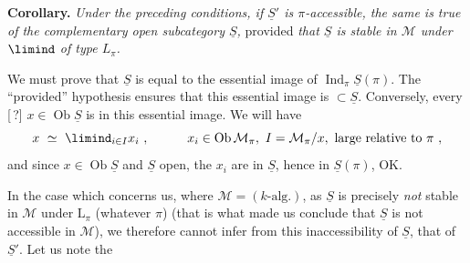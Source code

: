 \textbf{Corollary.} \textit{Under the preceding conditions, if $\underline{S}'$ is $\pi$-accessible, the same is true of the complementary open subcategory $\underline{S}$,} provided \textit{that $\underline{S}$ is stable in $\mathcal{M}$ under $\limind$ of type $L_\pi$.}

We must prove that $\underline{S}$ is equal to the essential image of $\operatorname{Ind}_\pi\underline{S}(\pi)$. The ``provided'' hypothesis ensures that this essential image is $\subset\underline{S}$. Conversely, every [\,?] $x\in\operatorname{Ob}\underline{S}$ is in this essential image. We will have
\[
x\ \simeq\ \limind_{i\in I}x_i\ ,\qquad\quad x_i\in\operatorname{Ob}\mathcal{M}_\pi,\ I=\mathcal{M}_\pi/x,\ \text{large relative to } \pi\ ,
\]
and since $x\in\operatorname{Ob}\underline{S}$ and $\underline{S}$ open, the $x_i$ are in $\underline{S}$, hence in $\underline{S}(\pi)$, OK.

In the case which concerns us, where $\mathcal{M}=(k\text{-alg.})$, as $\underline{S}$ is precisely \textit{not} stable in $\mathcal{M}$ under $\mathrm{L}_\pi$ (whatever $\pi$) (that is what made us conclude that
$\underline{S}$ is not accessible in $\mathcal{M}$), we therefore cannot infer from this inaccessibility of $\underline{S}$, that of $\underline{S}'$. Let us note the
